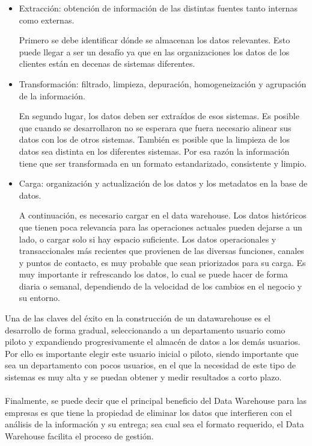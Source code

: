 \documentclass[11pt,a4paper]{article}
\begin{document}
				\begin{itemize}
					
					\item Extracción: obtención de información de las distintas fuentes tanto internas como externas.
					
					 Primero se debe identificar dónde se almacenan los datos relevantes. Esto puede llegar a ser un desafío ya que en las organizaciones los datos de los clientes están en decenas de sistemas diferentes.
					 
					 \item Transformación: filtrado, limpieza, depuración, homogeneización y agrupación de la información.
					 
					 En segundo lugar, los datos deben ser extraídos de esos sistemas. Es posible que cuando se desarrollaron no se esperara que fuera necesario alinear sus datos con los de otros sistemas. También es posible que la limpieza de los datos sea distinta en los diferentes sistemas. Por esa razón la información tiene que ser transformada en un formato estandarizado, consistente y limpio.
					 
					 \item Carga: organización y actualización de los datos y los metadatos en la base de datos.
					 
					 A continuación, es necesario cargar en el data warehouse. Los datos históricos que tienen poca relevancia para las operaciones actuales pueden dejarse a un lado, o cargar solo si hay espacio suficiente. Los datos operacionales y transaccionales más recientes que provienen de las diversas funciones, canales y puntos de contacto, es muy probable que sean priorizados para su carga. Es muy importante ir refrescando los datos, lo cual se puede hacer de forma diaria o semanal, dependiendo de la velocidad de los cambios en el negocio y su entorno.
						
				\end{itemize}
			
			Una de las claves del éxito en la construcción de un datawarehouse es el desarrollo de forma gradual, seleccionando a un departamento usuario como piloto y expandiendo progresivamente el almacén de datos a los demás usuarios. Por ello es importante elegir este usuario inicial o piloto, siendo importante que sea un departamento con pocos usuarios, en el que la necesidad de este tipo de sistemas es muy alta y se puedan obtener y medir resultados a corto plazo.\\
			\\
			Finalmente, se puede decir que el principal beneficio del Data Warehouse para las empresas es que tiene la propiedad de eliminar los datos que interfieren con el análisis de la información y su entrega; sea cual sea el formato requerido, el Data Warehouse facilita el proceso de gestión.\cite{DWarehouse03:Online}
			
\end{document}
